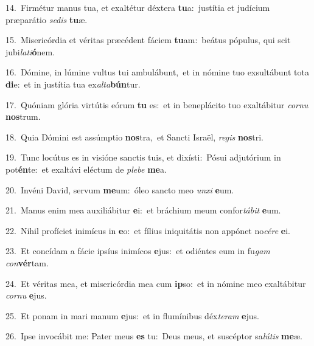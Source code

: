 {\numbfont\textcolor{\numbcolor}{14.}}~Firmétur manus tua, et exaltétur déxtera \textbf{tu}\-a:~\star justítia et judícium præparátio \textit{se}\-\textit{dis} \textbf{tu}\-æ.\par
{\numbfont\textcolor{\numbcolor}{15.}}~Misericórdia et véritas præcédent fáciem \textbf{tu}\-am:~\star beátus pópulus, qui scit jubi\-\textit{la}\-\textit{ti}\textbf{ó}nem.\par
{\numbfont\textcolor{\numbcolor}{16.}}~Dómine, in lúmine vultus tui ambulábunt,~\dagger et in nómine tuo exsultábunt tota \textbf{di}\-e:~\star et in justítia tua ex\-\textit{al}\-\textit{ta}\textbf{bún}tur.\par
{\numbfont\textcolor{\numbcolor}{17.}}~Quóniam glória virtútis eórum \textbf{tu} es:~\star et in beneplácito tuo exaltábitur \textit{cor}\-\textit{nu} \textbf{nos}\-trum.\par
{\numbfont\textcolor{\numbcolor}{18.}}~Quia Dómini est assúmptio \textbf{nos}\-tra,~\star et Sancti Israël, \textit{re}\-\textit{gis} \textbf{nos}\-tri.\par
{\numbfont\textcolor{\numbcolor}{19.}}~Tunc locútus es in visióne sanctis tuis, et dixísti:~\dagger Pósui adjutórium in pot\-\textbf{én}\-te:~\star et exaltávi eléctum de \textit{ple}\-\textit{be} \textbf{me}\-a.\par
{\numbfont\textcolor{\numbcolor}{20.}}~Invéni David, servum \textbf{me}\-um:~\star óleo sancto meo \textit{un}\-\textit{xi} \textbf{e}\-um.\par
{\numbfont\textcolor{\numbcolor}{21.}}~Manus enim mea auxiliábitur \textbf{e}\-i:~\star et bráchium meum confor\-\textit{tá}\-\textit{bit} \textbf{e}\-um.\par
{\numbfont\textcolor{\numbcolor}{22.}}~Nihil profíciet inimícus in \textbf{e}\-o:~\star et fílius iniquitátis non appónet no\-\textit{cé}\-\textit{re} \textbf{e}\-i.\par
{\numbfont\textcolor{\numbcolor}{23.}}~Et concídam a fácie ipsíus inimícos \textbf{e}\-jus:~\star et odiéntes eum in fu\textit{gam} \textit{con}\-\textbf{vér}tam.\par
{\numbfont\textcolor{\numbcolor}{24.}}~Et véritas mea, et misericórdia mea cum \textbf{ip}\-so:~\star et in nómine meo exaltábitur \textit{cor}\-\textit{nu} \textbf{e}\-jus.\par
{\numbfont\textcolor{\numbcolor}{25.}}~Et ponam in mari manum \textbf{e}\-jus:~\star et in flumínibus déx\-\textit{te}\-\textit{ram} \textbf{e}\-jus.\par
{\numbfont\textcolor{\numbcolor}{26.}}~Ipse invocábit me: Pater meus \textbf{es} tu:~\star Deus meus, et suscéptor sa\-\textit{lú}\-\textit{tis} \textbf{me}\-æ.\par
